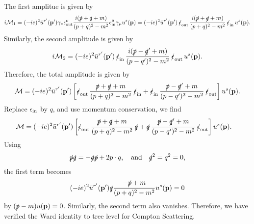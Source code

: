 \begin{solution}
    The first amplitue is given by
    \begin{equation}
        i\mathcal{M}_1 = (-ie)^2  \bar u^{r'}(\mathbf{p}')\gamma_\nu \epsilon _\text{out}^\nu\frac{i(\slashed{p}+\slashed{q}+m)}{(p+q)^2-m^2}\epsilon _\text{in}^\mu \gamma_\mu u^s(\mathbf{p}) = (-ie)^2\bar{u}^{r'}(\mathbf{p}')\,\slashed{\epsilon}_{\rm out}\,\frac{i(\slashed{p}+\slashed{q}+m)}{(p+q)^2-m^2}\,\slashed{\epsilon}_{\rm in}\,u^s(\mathbf{p}).
    \end{equation}
    Similarly, the second amplitude is given by
    \begin{equation}
        i\mathcal{M}_2 = (-ie)^2\bar{u}^{r'}(\mathbf{p}')\,\slashed{\epsilon}_{\rm in}\,\frac{i(\slashed{p}-\slashed{q}'+m)}{(p-q   ')^2-m^2}\,\slashed{\epsilon}_{\rm out}\,u^s(\mathbf{p}).
    \end{equation}
    Therefore, the total amplitude is given by
    \begin{equation}
        \mathcal{M} = (-ie)^2\bar{u}^{r'}(\mathbf{p}')\left[\slashed{\epsilon}_{\rm out}\,\frac{\slashed{p}+\slashed{q}+m}{(p+q)^2-m^2}\,\slashed{\epsilon}_{\rm in} + \slashed{\epsilon}_{\rm in}\,\frac{\slashed{p}-\slashed{q}'+m}{(p-q')^2-m^2}\,\slashed{\epsilon}_{\rm out}\right]u^s(\mathbf{p}).
    \end{equation}
    Replace $\epsilon_{\rm in}$ by $q$, and use momentum conservation, we find
    \begin{equation}
    \begin{aligned}
        \mathcal{M} &= (-ie)^2\bar{u}^{r'}(\mathbf{p}')\left[\slashed{\epsilon}_{\rm out}\,\frac{\slashed{p}+\slashed{q}+m}{(p+q)^2-m^2}\,\slashed{q} + \slashed{q}\,\frac{\slashed{p}-\slashed{q}'+m}{(p-q')^2-m^2}\,\slashed{\epsilon}_{\rm out}\right]u^s(\mathbf{p}).
    \end{aligned}
    \end{equation}
    Using 
    \begin{equation}
        \slashed{p}\slashed{q} = -\slashed{q}\slashed{p} +2p\cdot q, \quad {\rm and} \quad \slashed{q}^2 = q^2 = 0,
    \end{equation}
    the first term becomes
    \begin{equation}
        (-ie)^2\bar{u}^{r'}(\mathbf{p}') \slashed{q}\frac{-\slashed{p}+m}{(p+q)^2-m^2}u^s(\mathbf{p}) = 0
    \end{equation}
    by $(\slashed{p}-m)u(\mathbf{p})=0$. Similarly, the second term also vanishes. Therefore, we have verified the Ward identity to tree level for Compton Scattering.
\end{solution}

